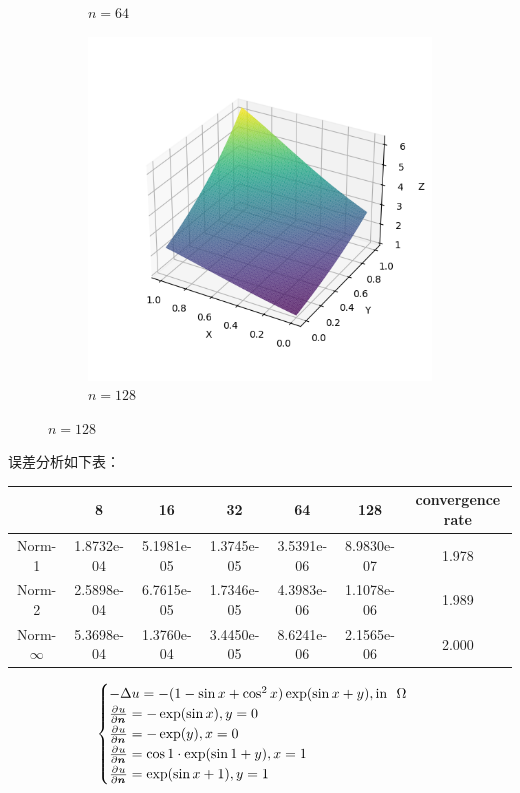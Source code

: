 \documentclass[lang=cn,a4paper,newtx,bibend=bibtex]{elegantpaper}
\begin{document}
\begin{figure}[H]
\begin{subfigure}[b]{0.18\textwidth}
      \caption{$n = 64$}
  \end{subfigure}
  \hfill
  \begin{subfigure}[b]{0.18\textwidth}
      \includegraphics[width=\textwidth]{../../res_bac/res-[data|1-Dirichlet-regular-e128].png}
      \caption{$n = 128$}
  \end{subfigure}
\end{figure}

误差分析如下表：

\begin{table}[H]
  \centering
  \begin{tabular}{|c|c|c|c|c|c|c|}
  \hline
   & 8 & 16 & 32 & 64 & 128 & convergence rate \\
  \hline
  Norm-1 & 1.8732e-04 & 5.1981e-05 & 1.3745e-05 & 3.5391e-06 & 8.9830e-07 & 1.978 \\
  Norm-2 & 2.5898e-04 & 6.7615e-05 & 1.7346e-05 & 4.3983e-06 & 1.1078e-06 & 1.989 \\
  Norm-$\infty$ & 5.3698e-04 & 1.3760e-04 & 3.4450e-05 & 8.6241e-06 & 2.1565e-06 & 2.000 \\
  \hline
  \end{tabular}
  \end{table}


\[
  \begin{cases}
    - \Delta u = -(1 - \sin x + \cos^2 x) \exp(\sin x + y), \text{in~~} \Omega \\
    \frac{\partial^{}{u}}{\partial {\bm{n}}^{}} = -\exp(\sin x), y = 0 \\
    \frac{\partial^{}{u}}{\partial {\bm{n}}^{}} = -\exp(y), x = 0 \\
    \frac{\partial^{}{u}}{\partial {\bm{n}}^{}} = \cos 1 \cdot \exp(\sin 1 + y), x = 1 \\ 
    \frac{\partial^{}{u}}{\partial {\bm{n}}^{}} = \exp(\sin x + 1), y = 1
  \end{cases}
\]
\end{document}
